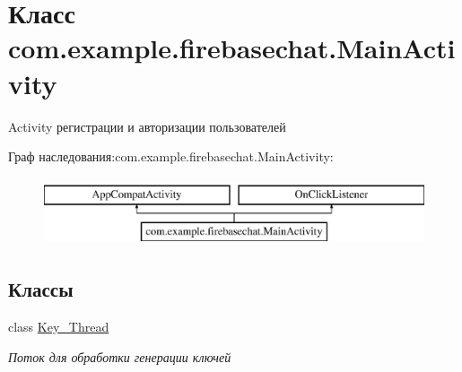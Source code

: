 \hypertarget{classcom_1_1example_1_1firebasechat_1_1_main_activity}{}\section{Класс com.\+example.\+firebasechat.\+Main\+Activity}
\label{classcom_1_1example_1_1firebasechat_1_1_main_activity}


Activity регистрации и авторизации пользователей  


Граф наследования\+:com.\+example.\+firebasechat.\+Main\+Activity\+:\begin{figure}[H]
\begin{center}
\leavevmode
\includegraphics[height=2.000000cm]{classcom_1_1example_1_1firebasechat_1_1_main_activity}
\end{center}
\end{figure}
\subsection*{Классы}
\begin{DoxyCompactItemize}
\item 
class \mbox{\hyperlink{classcom_1_1example_1_1firebasechat_1_1_main_activity_1_1_key___thread}{Key\+\_\+\+Thread}}
\begin{DoxyCompactList}\small\item\em Поток для обработки генерации ключей \end{DoxyCompactList}\end{DoxyCompactItemize}
